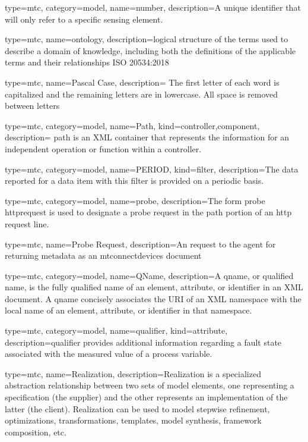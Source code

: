 {
  type=mtc,
  category=model,
  name={number},
  description={A unique identifier that will only refer to a specific \gls{sensing element}.}
}


{
  type=mtc,
  name=ontology,
  description={logical structure of the terms used to describe a domain of knowledge, including both the definitions of the applicable terms and their relationships ISO 20534:2018}
}


{
  type=mtc,
  name={Pascal Case},
  description= {The first letter of each word is capitalized and the remaining letters are in lowercase. All space is removed between letters}
}


{
  type=mtc,
  category=model,
  name={Path},
  kind={controller,component},
  description= {\gls{path} is an XML container that represents the information for an independent operation or function within a \gls{controller}.}
}


{
  type=mtc,
  category=model,
  name={PERIOD},
  kind={filter},
  description={The data reported for a data item with this \gls{filter} is provided on a periodic basis.}
}



{
  type=mtc,
  category=model,
  name={probe},
  description={The form \gls{probe httprequest} is used to designate a \gls{probe request} in the path portion of an \gls{http request line}.}
}


{
  type=mtc,
  name={Probe Request},
  description={An  request to the \gls{agent} for returning metadata as an \glspl{mtconnectdevice}  document}
}


{
  type=mtc,
  category=model,
  name={QName},
  description={A \gls{qname}, or qualified name, is the fully qualified name of an element, attribute, or identifier in an XML document. A  \gls{qname} concisely associates the URI of an XML namespace with the local name of an element, attribute, or identifier in that namespace.}
}


{
  type=mtc,
  category=model,
  name={qualifier},
  kind={attribute},
  description={\gls{qualifier} provides additional information regarding a \gls{fault state} associated with the measured value of a process variable.}
}


{
  type=mtc,
  name={Realization},
  description={Realization is a specialized abstraction relationship between two sets of model elements, one representing a specification (the supplier) and the other represents an implementation of the latter (the client). Realization can be used to model stepwise refinement, optimizations, transformations, templates, model synthesis, framework composition, etc.}
}


